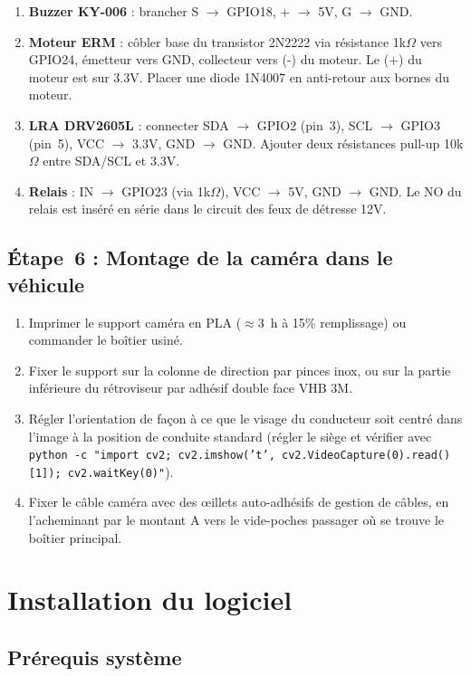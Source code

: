 \documentclass[12pt,a4paper]{report}
\begin{document}
\begin{enumerate}
  \item \textbf{Buzzer KY-006} : brancher S $\to$ GPIO18, + $\to$ 5V, G $\to$ GND.
  \item \textbf{Moteur ERM} : c\^obler base du transistor 2N2222 via r\'esistance 1k$\Omega$ vers GPIO24, \'emetteur vers GND, collecteur vers (-) du moteur. Le (+) du moteur est sur 3.3V. Placer une diode 1N4007 en anti-retour aux bornes du moteur.
  \item \textbf{LRA DRV2605L} : connecter SDA $\to$ GPIO2 (pin~3), SCL $\to$ GPIO3 (pin~5), VCC $\to$ 3.3V, GND $\to$ GND. Ajouter deux r\'esistances pull-up 10k$\Omega$ entre SDA/SCL et 3.3V.
  \item \textbf{Relais} : IN $\to$ GPIO23 (via 1k$\Omega$), VCC $\to$ 5V, GND $\to$ GND. Le NO du relais est ins\'er\'e en s\'erie dans le circuit des feux de d\'etresse 12V.
\end{enumerate}

\subsection{\'Etape~6 : Montage de la cam\'era dans le v\'ehicule}

\begin{enumerate}
  \item Imprimer le support cam\'era en PLA ($\approx$3~h \`a 15\% remplissage) ou commander le bo\^itier usin\'e.
  \item Fixer le support sur la colonne de direction par pinces inox, ou sur la partie inf\'erieure du r\'etroviseur par adh\'esif double face VHB 3M.
  \item R\'egler l'orientation de fa\c{c}on \`a ce que le visage du conducteur soit centr\'e dans l'image \`a la position de conduite standard (r\'egler le si\`ege et v\'erifier avec \texttt{python -c "import cv2; cv2.imshow('t', cv2.VideoCapture(0).read()[1]); cv2.waitKey(0)"}).
  \item Fixer le c\^able cam\'era avec des \oe illets auto-adh\'esifs de gestion de c\^ables, en l'acheminant par le montant A vers le vide-poches passager o\`u se trouve le bo\^itier principal.
\end{enumerate}

\section{Installation du logiciel}

\subsection{Pr\'erequis syst\`eme}
\end{document}
